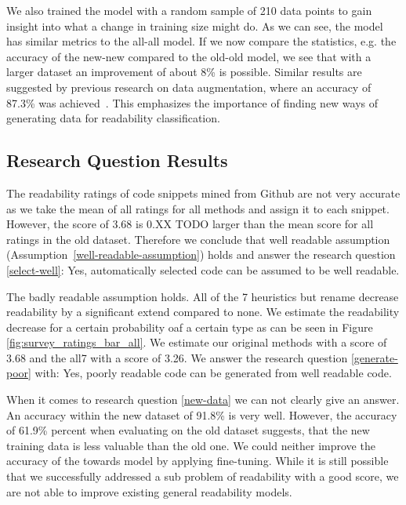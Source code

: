 \documentclass[%
class=scrreprt,
chapterprefix=false,%
open=right,%
twoside=false,%
paper=a4,%
logofile={Logo\_zentral\_farbig\_EN.png},%
thesistype=master,%
UKenglish,%
]{se2thesis}
\theoremstyle{definition}
\begin{document}
	We also trained the model with a random sample of 210 data points to gain insight into what a change in training size might do. As we can see, the model has similar metrics to the all-all model. If we now compare the statistics, e.g. the accuracy of the new-new compared to the old-old model, we see that with a larger dataset an improvement of about 8\% is possible. Similar results are suggested by previous research on data augmentation, where an accuracy of 87.3\% was achieved~\citeauthor{mi2021effectiveness}. This emphasizes the importance of finding new ways of generating data for readability classification. 
	
\subsection{Research Question Results} \label{Research Question Results}


	The readability ratings of code snippets mined from Github are not very accurate as we take the mean of all ratings for all methods and assign it to each snippet. However, the score of 3.68 is 0.XX TODO larger than the mean score for all ratings in the old dataset. Therefore we conclude that well readable assumption (Assumption~\ref{well-readable-assumption}) holds and answer the research question \ref{select-well}: Yes, automatically selected code can be assumed to be well readable.
	
	The badly readable assumption holds. All of the 7 heuristics but rename decrease readability by a significant extend compared to none. We estimate the readability decrease for a certain probability oaf a certain type as can be seen in Figure \ref{fig:survey_ratings_bar_all}. We estimate our original methods with a score of 3.68 and the all7 with a score of 3.26. We answer the research question \ref{generate-poor} with: Yes, poorly readable code can be generated from well readable code.
	
	When it comes to research question \ref{new-data} we can not clearly give an answer. An accuracy within the new dataset of 91.8\% is very well. However, the accuracy of 61.9\% percent when evaluating on the old dataset suggests, that the new training data is less valuable than the old one. We could neither improve the accuracy of the towards model by applying fine-tuning. While it is still possible that we successfully addressed a sub problem of readability with a good score, we are not able to improve existing general readability models.
	
\end{document}
